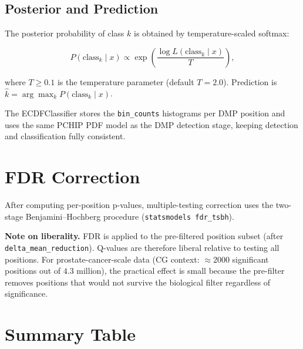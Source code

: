 \documentclass[11pt]{article}
\begin{document}
\subsection{Posterior and Prediction}

The posterior probability of class \(k\) is obtained by
temperature-scaled softmax:

\begin{equation}
  P(\text{class}_k \mid x)
  \propto \exp\!\left(\frac{\log L(\text{class}_k \mid x)}{T}\right),
  \label{eq:posterior}
\end{equation}

where \(T \geq 0.1\) is the temperature parameter (default \(T = 2.0\)).
Prediction is \(\hat{k} = \arg\max_k P(\text{class}_k \mid x)\).

The ECDFClassifier stores the \texttt{bin\_counts} histograms per DMP
position and uses the same PCHIP PDF
model as the DMP detection stage, keeping detection and classification
fully consistent.

\section{FDR Correction}

After computing per-position p-values, multiple-testing correction uses the
two-stage Benjamini--Hochberg procedure (\texttt{statsmodels fdr\_tsbh}).

\textbf{Note on liberality.}  FDR is applied to the pre-filtered position
subset (after \texttt{delta\_mean\_reduction}).  Q-values are therefore
liberal relative to testing all positions.  For prostate-cancer-scale data
(CG context: \(\approx\!2000\) significant positions out of \(4.3\) million),
the practical effect is small because the pre-filter removes positions that
would not survive the biological filter regardless of significance.

\section{Summary Table}
\end{document}
